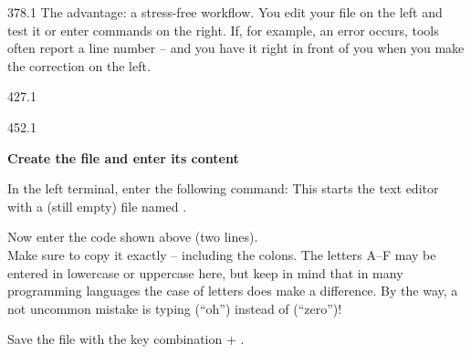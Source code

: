 \documentclass{aslab}
\begin{document}


\begin{region}{378.1}
The advantage: a stress-free workflow. You edit your file on the left and
test it or enter commands on the right. If, for example, an error occurs,
tools often report a line number -- and you have it right in front of you
when you make the correction on the left.
\end{region}

\begin{region}{427.1}
\end{region}

\begin{region}{452.1}
\begin{tasks}
\item \textbf{Create the file and enter its content}
  \begin{steps}
  \item In the left terminal, enter the following command:
    \blank
    \blank
    This starts the text editor  with a (still empty) file
    named .
  \item Now enter the code shown above (two lines).\\
    Make sure to copy it exactly -- including the colons. The letters A--F
    may be entered in lowercase or uppercase here, but keep in mind that in
    many programming languages the case of letters does make a difference.
    By the way, a not uncommon mistake is typing  (``oh'') instead of
     (``zero'')!
  \item Save the file with the key combination  + .
  \end{steps}
\end{tasks}
\end{region}
\end{document}
